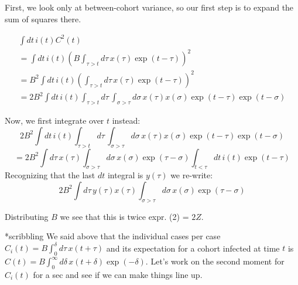 \documentclass[12pt]{article}
\begin{document}
First, we look only at between-cohort variance, so our first step is to expand the sum of squares there.

\begin{eqnarray}
\int{dt\, i(t) C^2(t)}
	\\ = \int{dt\, i(t) \left(
		B \int_{\tau>t}{d\tau\, x(\tau) \exp(t-\tau)}
	\right)^2}
	\\ = B^2 \int{dt\, i(t) \left(
		\int_{\tau>t}{d\tau\, x(\tau) \exp(t-\tau)}
	\right)^2}
	\\ =  2B^2 \int{dt\, i(t) \int_{\tau>t}{d\tau\, \int_{\sigma>\tau}{d\sigma\, x(\tau) x(\sigma) \exp(t-\tau)\exp(t-\sigma)}}}
\end{eqnarray}

Now, we first integrate over $t$ instead:
  $$ 2B^2 \int{dt\, i(t) \int_{\tau>t}{d\tau\, \int_{\sigma>\tau}{d\sigma\, x(\tau) x(\sigma) \exp(t-\tau)\exp(t-\sigma)}}}$$
  $$ = 2B^2 \int{d\tau\, x(\tau) \int_{\sigma > \tau}{d\sigma\, x(\sigma) \exp(\tau-\sigma)\int_{t<\tau}{dt\, i(t) \exp(t-\tau)}}}$$
Recognizing that the last $dt$ integral is $y(\tau)$ we re-write:
 $$ 2B^2 \int{d\tau\, y(\tau)x(\tau) \int_{\sigma>\tau}{d\sigma\, x(\sigma) \exp(\tau-\sigma)}}$$

Distributing $B$ we see that this is twice expr. (2) = $2Z$.




%

*scribbling
We said above that the individual cases per case $C_i(t) = B\int_{0}^{\delta}{d\tau\, x(t + \tau)}$ and its expectation for a cohort infected at time $t$ is $C(t) = B\int_{0}^{\infty}{d\delta\, x(t+\delta) \exp(-\delta)}$. Let's work on the second moment for $C_i(t)$ for a sec and see if we can make things line up.
\end{document}
